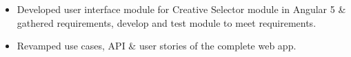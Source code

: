 \documentclass[10pt,a4paper,ragged2e]{altacv}
\begin{document}
\divider

\begin{itemize}
    \item Developed user interface module for Creative Selector module in Angular 5 \&  gathered requirements, develop and test module to meet requirements.
    
    \item Revamped use cases, API \& user stories of the complete web app.
    
\end{itemize}










\clearpage


\nocite{*}






\end{document}
